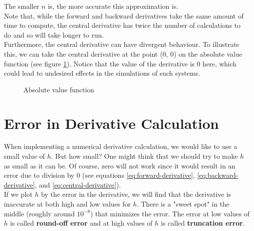 \documentclass[]{article}
\begin{document}
The smaller $n$ is, the more accurate this approximation is.\\

Note that, while the forward and backward derivatives take the same amount of time to compute, the central derivative has twice the number of calculations to do and so will take longer to run.\\ 

Furthermore, the central derivative can have divergent behaviour. To illustrate this, we can take the central derivative at the point (0, 0) on the absolute value function (see figure \ref{fig:absolute-value}). Notice that the value of the derivative is 0 here, which could lead to undesired effects in the simulations of such systems.\\

\begin{figure}[th!]
	\centering
	\caption{Absolute value function} \label{fig:absolute-value}
	\bigbreak
\end{figure}

\section{Error in Derivative Calculation}\bigbreak\bigbreak

When implementing a numerical derivative calculation, we would like to use a small value of $h$. But how small? One might think that we should try to make $h$ as small as it can be. Of course, zero will not work since it would result in an error due to division by 0 (see equations \ref{eq:forward-derivative}, \ref{eq:backward-derivative}, and \ref{eq:central-derivative}). \\

If we plot $h$ by the error in the derivative, we will find that the derivative is inaccurate at both high and low values for $h$. There is a "sweet spot" in the middle (roughly around $10^{-8}$) that minimizes the error. The error at low values of $h$ is called \textbf{round-off error} and at high values of $h$ is called \textbf{truncation error}.\\
\end{document}
